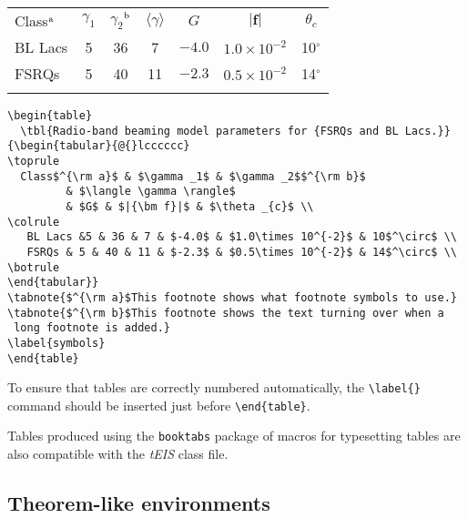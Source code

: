 \documentclass[]{tEIS2e}
\theoremstyle{plain}
\theoremstyle{remark}
\begin{document}
\begin{table}
{\begin{tabular}[l]{@{}lcccccc}
\toprule
  Class$^{\rm a}$ & $\gamma _1$ & $\gamma _2$$^{\rm b}$
         & $\langle \gamma \rangle$
         & $G$ & $|{\bm f}|$ & $\theta _{c}$ \\
\colrule
  BL Lacs &5 & 36 & 7 & $-4.0$ & $1.0\times 10^{-2}$ & 10$^\circ$ \\
  FSRQs & 5 & 40 & 11 & $-2.3$ & $0.5\times 10^{-2}$ & 14$^\circ$ \\
\botrule
\end{tabular}}
\label{symbols}
\end{table}

\begin{verbatim}
\begin{table}
  \tbl{Radio-band beaming model parameters for {FSRQs and BL Lacs.}}
{\begin{tabular}{@{}lcccccc}
\toprule
  Class$^{\rm a}$ & $\gamma _1$ & $\gamma _2$$^{\rm b}$
         & $\langle \gamma \rangle$
         & $G$ & $|{\bm f}|$ & $\theta _{c}$ \\
\colrule
   BL Lacs &5 & 36 & 7 & $-4.0$ & $1.0\times 10^{-2}$ & 10$^\circ$ \\
   FSRQs & 5 & 40 & 11 & $-2.3$ & $0.5\times 10^{-2}$ & 14$^\circ$ \\
\botrule
\end{tabular}}
\tabnote{$^{\rm a}$This footnote shows what footnote symbols to use.}
\tabnote{$^{\rm b}$This footnote shows the text turning over when a
 long footnote is added.}
\label{symbols}
\end{table}
\end{verbatim}

To ensure that tables are correctly numbered automatically, the
\verb"\label{}" command should be inserted just before
\verb"\end{table}".

Tables produced using the {\tt booktabs} package of macros for typesetting tables are also compatible with the {\it tEIS} class file.


\subsection{Theorem-like environments}
\end{document}
